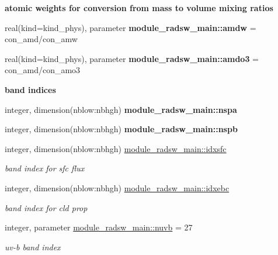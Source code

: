 \begin{Indent}\textbf{ atomic weights for conversion from mass to volume mixing ratios}\par
\begin{DoxyCompactItemize}
\item 
real(kind=kind\+\_\+phys), parameter {\bfseries module\+\_\+radsw\+\_\+main\+::amdw} = con\+\_\+amd/con\+\_\+amw
\item 
real(kind=kind\+\_\+phys), parameter {\bfseries module\+\_\+radsw\+\_\+main\+::amdo3} = con\+\_\+amd/con\+\_\+amo3
\end{DoxyCompactItemize}
\end{Indent}
\begin{Indent}\textbf{ band indices}\par
\begin{DoxyCompactItemize}
\item 
integer, dimension(nblow\+:nbhgh) {\bfseries module\+\_\+radsw\+\_\+main\+::nspa}
\item 
integer, dimension(nblow\+:nbhgh) {\bfseries module\+\_\+radsw\+\_\+main\+::nspb}
\item 
integer, dimension(nblow\+:nbhgh) \hyperlink{group__module__radsw__main_gad295d723dd7d269cb51c73923a4cbb94}{module\+\_\+radsw\+\_\+main\+::idxsfc}
\begin{DoxyCompactList}\small\item\em band index for sfc flux \end{DoxyCompactList}\item 
integer, dimension(nblow\+:nbhgh) \hyperlink{group__module__radsw__main_gaa20102786f7e7f8c71fb2783082eac1b}{module\+\_\+radsw\+\_\+main\+::idxebc}
\begin{DoxyCompactList}\small\item\em band index for cld prop \end{DoxyCompactList}\item 
integer, parameter \hyperlink{group__module__radsw__main_ga177282b3087dce2f54f1233ee8631231}{module\+\_\+radsw\+\_\+main\+::nuvb} = 27
\begin{DoxyCompactList}\small\item\em uv-\/b band index \end{DoxyCompactList}\end{DoxyCompactItemize}
\end{Indent}
